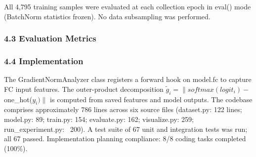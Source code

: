 All 4,795 training samples were evaluated at each collection epoch in eval() mode (BatchNorm statistics frozen). No data subsampling was performed.

\subsubsection{4.3 Evaluation Metrics}

\begin{table}[htbp]
\centering
{}
\end{table}

\subsubsection{4.4 Implementation}

The GradientNormAnalyzer class registers a forward hook on model.fc to capture FC input features. The outer-product decomposition $\tilde{g}_i = \|softmax(logit_{i}) -$ one\_hot($y_{i})\|$ is computed from saved features and model outputs. The codebase comprises approximately 786 lines across six source files (dataset.py: 122 lines; model.py: 89; train.py: 154; evaluate.py: 162; visualize.py: 259; run\_experiment.py: ~200). A test suite of 67 unit and integration tests was run; all 67 passed. Implementation planning compliance: 8/8 coding tasks completed (100\%).

